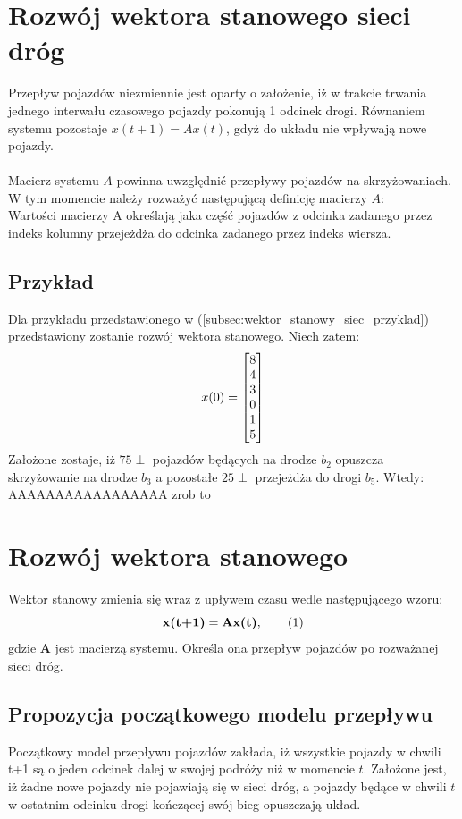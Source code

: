 \documentclass[12pt]{book}
\theoremstyle{plain}
\newcommand\addtag{\refstepcounter{equation}
\renewcommand{\labelenumii}{\theenumii}
\renewcommand{\theenumii}{\theenumi.\arabic{enumii}.}
\tag{\theequation}}
\begin{document}
\section{Rozwój wektora stanowego sieci dróg}
Przepływ pojazdów niezmiennie jest oparty o założenie, iż w trakcie trwania jednego interwału czasowego pojazdy pokonują 1 odcinek drogi. Równaniem systemu pozostaje $x(t+1)=Ax(t)$, gdyż do układu nie wpływają nowe pojazdy.\\ \\
Macierz systemu $A$ powinna uwzględnić przepływy pojazdów na skrzyżowaniach. W tym momencie należy rozważyć następującą definicję macierzy $A$:\\
Wartości macierzy A określają jaka część pojazdów z odcinka zadanego przez indeks kolumny przejeżdża do odcinka zadanego przez indeks wiersza.


\subsection{Przykład}
Dla przykładu przedstawionego w (\ref{subsec:wektor_stanowy_siec_przyklad}) przedstawiony zostanie rozwój wektora stanowego. Niech zatem:
\[x(0)=\begin{bmatrix} 8 \\ 4 \\ 3 \\ 0 \\ 1 \\ 5 \end{bmatrix} \]
Założone zostaje, iż $75\perp$ pojazdów będących na drodze $b_2$ opuszcza skrzyżowanie na drodze $b_3$ a pozostałe $25\perp$ przejeżdża do drogi $b_5$. Wtedy:
AAAAAAAAAAAAAAAAA zrob to

\section{Rozwój wektora stanowego}
Wektor stanowy zmienia się wraz z upływem czasu wedle następującego wzoru:
\[\textbf{x(t+1)}=\textbf{Ax(t)}, \addtag \label{eq:Ax} \]
gdzie $\textbf{A}$ jest macierzą systemu. Określa ona przepływ pojazdów po rozważanej sieci dróg.
\subsection{Propozycja początkowego modelu przepływu}
Początkowy model przepływu pojazdów zakłada, iż wszystkie pojazdy w chwili t+1 są o jeden odcinek dalej w swojej podróży niż w momencie $t$. Założone jest, iż żadne nowe pojazdy nie pojawiają się w sieci dróg, a pojazdy będące w chwili $t$ w ostatnim odcinku drogi kończącej swój bieg opuszczają układ.
\end{document}
